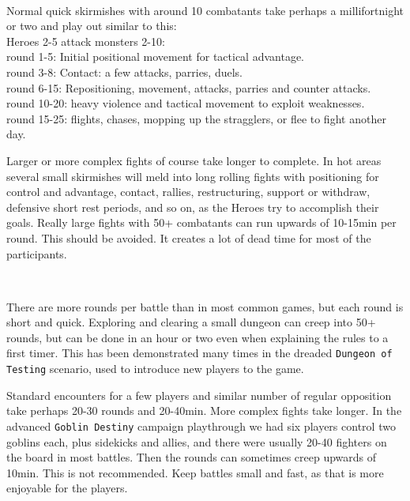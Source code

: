 \

Normal quick skirmishes with around 10 combatants take perhaps a millifortnight or two and play out similar to this: \\
Heroes 2-5 attack monsters 2-10: \\
round 1-5: Initial positional movement for tactical advantage. \\
round 3-8: Contact: a few attacks, parries, duels. \\
round 6-15: Repositioning, movement, attacks, parries and counter attacks. \\
round 10-20: heavy violence and tactical movement to exploit weaknesses. \\
round 15-25: flights, chases, mopping up the stragglers, or flee to fight another day.

Larger or more complex fights of course take longer to complete. In hot areas several small skirmishes will meld into long rolling fights with positioning for control and advantage, contact, rallies, restructuring, support or withdraw, defensive short rest periods, and so on, as the Heroes try to accomplish their goals.
Really large fights with 50+ combatants can run upwards of 10-15min per round. This should be avoided. It creates a lot of dead time for most of the participants.

\

There are more rounds per battle than in most common games, but each round is short and quick. Exploring and clearing a small dungeon can creep into 50+ rounds, but can be done in an hour or two even when explaining the rules to a first timer. This has been demonstrated many times in the dreaded \texttt{Dungeon of Testing} scenario, used to introduce new players to the game.

Standard encounters for a few players and similar number of regular opposition take perhaps 20-30 rounds and 20-40min. More complex fights take longer. In the advanced \texttt{Goblin Destiny} campaign playthrough we had six players control two goblins each, plus sidekicks and allies, and there were usually 20-40 fighters on the board in most battles. Then the rounds can sometimes creep upwards of 10min. This is not recommended. Keep battles small and fast, as that is more enjoyable for the players.

